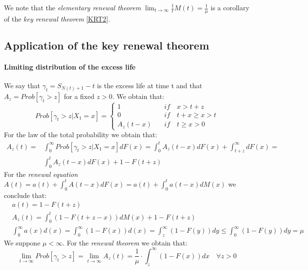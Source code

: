 We note that the \textit{elementary renewal theorem} $\lim_{t \to \infty} \frac{1}{t} M(t) = \frac{1}{\mu}$ is a corollary of the \textit{key renewal theorem} \ref{KRT2}.

\subsection{Application of the key renewal theorem}

\paragraph{Limiting distribution of the excess life}

We say that $\gamma_{t}=S_{N(t)+1}-t$ is the excess life at time t and that $A_z=Prob[\gamma_t>z]$ for a fixed $z>0$. We obtain that:
\begin{equation*}
	Prob[\gamma_t>z|X_1=x] = \begin{cases}
		1 \quad & if \quad x > t+z \\
		0 \quad & if \quad t+x \geq x > t \\
		A_z(t-x) \quad & if \quad t \geq x > 0
	\end{cases}
\end{equation*}
For the law of the total probability we obtain that:
\begin{align*}
	A_z(t)= & \int_{0}^{\infty} Prob[\gamma_t>z|X_1=x] dF(x) = \int_{0}^{t}A_z(t-x)dF(x)+\int_{t+z}^{\infty}dF(x)= \\ & \int_{0}^{t}A_z(t-x)dF(x)+1-F(t+z)
\end{align*}
For the \textit{renewal equation} $ A(t)=a(t)+\int_{0}^{t}A(t-x)dF(x)=a(t)+\int_{0}^{t}a(t-x)dM(x) $ we conclude that:
\begin{align*}
	& a(t) = 1 - F(t+z) \\
	& A_z(t)=\int_{0}^{t}(1-F(t+z-x))dM(x)+1-F(t+z) \\
	& \int_{0}^{\infty} a(x) d(x) = \int_{0}^{\infty}(1-F(x)) d(x) = \int_{z}^{\infty}(1-F(y))dy \leq \int_{0}^{\infty}(1-F(y))dy = \mu
\end{align*}
We suppone $\mu < \infty$. For the \textit{renewal theorem} we obtain that:
\begin{equation}
	\lim_{t \rightarrow \infty} Prob[\gamma_t>z] = \lim_{t \rightarrow \infty} A_z(t) = \frac{1}{\mu} \cdot \int_z^{\infty}(1-F(x))dx \quad \forall z > 0
	\label{limitingdistribution}
\end{equation}

